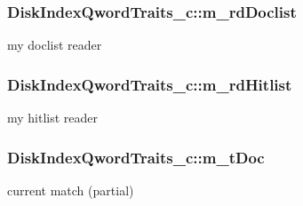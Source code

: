 \hypertarget{classDiskIndexQwordTraits__c_a1bd875b56456639db467b87e37449c0b}{
\subsubsection[{m\-\_\-rd\-Doclist}]{ Disk\-Index\-Qword\-Traits\-\_\-c\-::m\-\_\-rd\-Doclist}}\label{classDiskIndexQwordTraits__c_a1bd875b56456639db467b87e37449c0b}


my doclist reader 

\hypertarget{classDiskIndexQwordTraits__c_ac8b3bbb101f1ed476d37251f0c460bba}{
\subsubsection[{m\-\_\-rd\-Hitlist}]{ Disk\-Index\-Qword\-Traits\-\_\-c\-::m\-\_\-rd\-Hitlist}}\label{classDiskIndexQwordTraits__c_ac8b3bbb101f1ed476d37251f0c460bba}


my hitlist reader 

\hypertarget{classDiskIndexQwordTraits__c_ae1176e7eb07c224d8b58608fbf3af360}{
\subsubsection[{m\-\_\-t\-Doc}]{ Disk\-Index\-Qword\-Traits\-\_\-c\-::m\-\_\-t\-Doc}}\label{classDiskIndexQwordTraits__c_ae1176e7eb07c224d8b58608fbf3af360}


current match (partial) 

